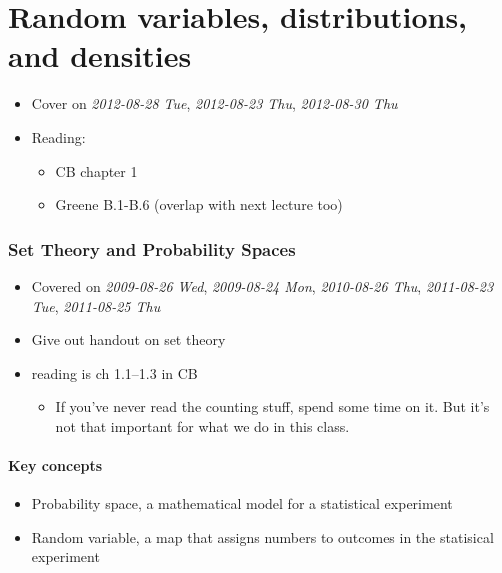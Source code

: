 
\part{Random variables, distributions, and densities}

\begin{itemize}
\item Cover on \textit{2012-08-28 Tue}, \textit{2012-08-23 Thu}, \textit{2012-08-30 Thu}
\item Reading:
\begin{itemize}
\item CB chapter 1
\item Greene B.1-B.6 (overlap with next lecture too)
\end{itemize}
\end{itemize}
\section{Set Theory and Probability Spaces}
\label{sec-1}

\begin{itemize}
\item Covered on \textit{2009-08-26 Wed}, \textit{2009-08-24 Mon}, \textit{2010-08-26 Thu},
      \textit{2011-08-23 Tue}, \textit{2011-08-25 Thu}
\item Give out handout on set theory
\item reading is ch 1.1--1.3 in CB
\begin{itemize}
\item If you've never read the counting
        stuff, spend some time on it.  But it's not that important for
        what we do in this class.
\end{itemize}
\end{itemize}
\subsection{Key concepts}
\label{sec-1-1}

\begin{itemize}
\item Probability space, a mathematical model for a statistical experiment
\item Random variable, a map that assigns numbers to outcomes in the
       statisical experiment
\end{itemize}
